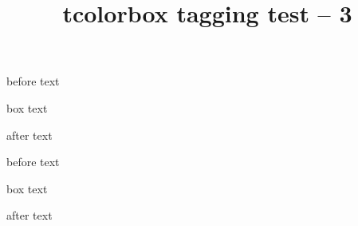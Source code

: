 \documentclass{article}
\title{tcolorbox tagging test -- 3}
\begin{document}
before text
\begin{tcolorbox}[]
box text
\end{tcolorbox}
after text

before text
\begin{tcolorbox}[capture=fitbox]
box text
\end{tcolorbox}
after text
\end{document}
